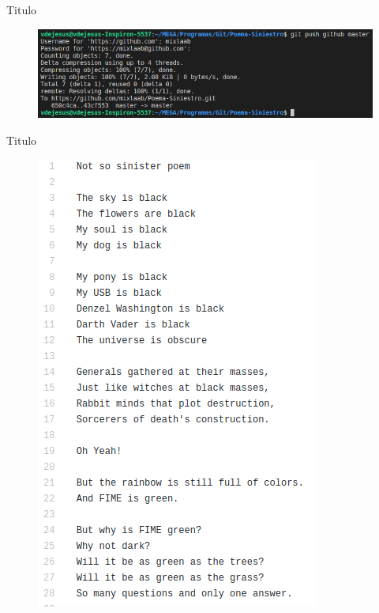 \documentclass[10pt]{beamer}
\begin{document}
\begin{frame}{Titulo}{}

  \begin{block}{}
  
  \begin{figure}[h!]
  \centering
  \includegraphics [scale=0.28]{step14}
  \label{fig:step14}
  \end{figure}
      
  \end{block}
  
\end{frame}

\begin{frame}{Titulo}{}

  \begin{block}{}
  
  \begin{figure}[h!]
  \centering
  \includegraphics [scale=0.28]{step15}
  \label{fig:step15}
  \end{figure}
      
  \end{block}
  
\end{frame}
\end{document}
